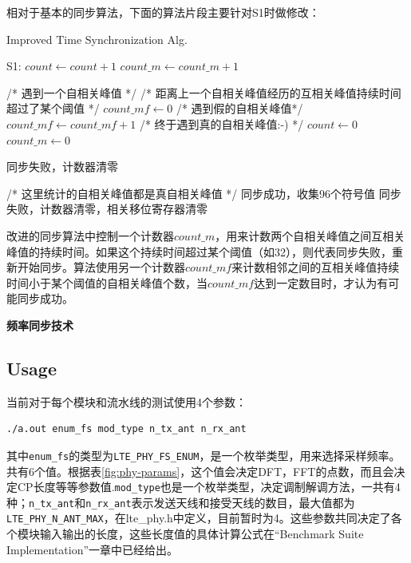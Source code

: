 \documentclass[titlepage]{article}
\numberwithin{figure}{section}
\numberwithin{equation}{section}
\begin{document}
相对于基本的同步算法，下面的算法片段主要针对S1时做修改：

\begin{algorithm}[H]
\caption{Improved Time Synchronization Alg.}
\begin{algorithmic}[1]
\State S1:
\State $count \gets count + 1$
\Else
\State $count\_m \gets count\_m + 1$
\EndIf

 /* 遇到一个自相关峰值 */
 /* 距离上一个自相关峰值经历的互相关峰值持续时间超过了某个阈值 */
\State $count\_mf \gets 0$ /* 遇到假的自相关峰值*/
\Else
\State $count\_mf \gets count\_mf + 1$ /* 终于遇到真的自相关峰值:-) */
\State $count \gets 0$
\State $count\_m \gets 0$
\EndIf
\EndIf

\State 同步失败，计数器清零
\EndIf

 /* 这里统计的自相关峰值都是真自相关峰值 */
\State 同步成功，收集96个符号值
\Else
\State 同步失败，计数器清零，相关移位寄存器清零
\EndIf
\EndIf

\end{algorithmic}
\end{algorithm}

改进的同步算法中控制一个计数器$count\_m$，用来计数两个自相关峰值之间互相关峰值的持续时间。如果这个持续时间超过某个阈值（如32），则代表同步失败，重新开始同步。算法使用另一个计数器$count\_mf$来计数相邻之间的互相关峰值持续时间小于某个阈值的自相关峰值个数，当$count\_mf$达到一定数目时，才认为有可能同步成功。


\textbf{频率同步技术}

\subsection{Usage}

当前对于每个模块和流水线的测试使用4个参数：

\begin{verbatim}
./a.out enum_fs mod_type n_tx_ant n_rx_ant
\end{verbatim}

其中\verb|enum_fs|的类型为\verb|LTE_PHY_FS_ENUM|，是一个枚举类型，用来选择采样频率。共有6个值。根据表\ref{fig:phy-params}，这个值会决定DFT，FFT的点数，而且会决定CP长度等等参数值.\verb|mod_type|也是一个枚举类型，决定调制解调方法，一共有4种；\verb|n_tx_ant|和\verb|n_rx_ant|表示发送天线和接受天线的数目，最大值都为\verb|LTE_PHY_N_ANT_MAX|，在lte\_phy.h中定义，目前暂时为4。这些参数共同决定了各个模块输入输出的长度，这些长度值的具体计算公式在“Benchmark Suite Implementation”一章中已经给出。
\end{document}
